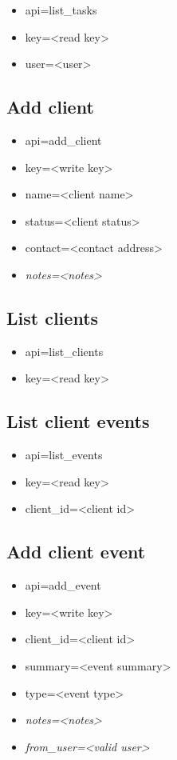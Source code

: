 \documentclass[11pt]{article}
\begin{document}
\begin{itemize}
\item api=list\_tasks
\item key=<read key>
\item user=<user>
\end{itemize}

\subsection{Add client}

\begin{itemize}
\item api=add\_client
\item key=<write key>
\item name=<client name>
\item status=<client status>
\item contact=<contact address>
\item \textit{notes=<notes>}
\end{itemize}

\subsection{List clients}

\begin{itemize}
\item api=list\_clients
\item key=<read key>
\end{itemize}

\subsection{List client events}

\begin{itemize}
\item api=list\_events
\item key=<read key>
\item client\_id=<client id>
\end{itemize}

\subsection{Add client event}

\begin{itemize}
\item api=add\_event
\item key=<write key>
\item client\_id=<client id>
\item summary=<event summary>
\item type=<event type>
\item \textit{notes=<notes>}
\item \textit{from\_user=<valid user>}
\end{itemize}
\end{document}
